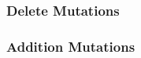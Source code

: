 \documentclass[a4paper,12pt]{article}
\begin{document}
\subsubsection{Delete Mutations}

\subsubsection{Addition Mutations}



%
%
\end{document}
